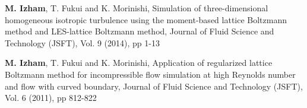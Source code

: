 \item \textbf{M. Izham}, T. Fukui and K. Morinishi, Simulation of three-dimensional homogeneous isotropic turbulence using the moment-based lattice Boltzmann method and LES-lattice Boltzmann method, Journal of Fluid Science and Technology (JSFT), Vol. 9 (2014), pp 1-13 
\item \textbf{M. Izham}, T. Fukui and K. Morinishi, Application of regularized lattice Boltzmann method for incompressible flow simulation at high Reynolds number and flow with curved boundary, Journal of Fluid Science and Technology (JSFT), Vol. 6 (2011), pp 812-822 
